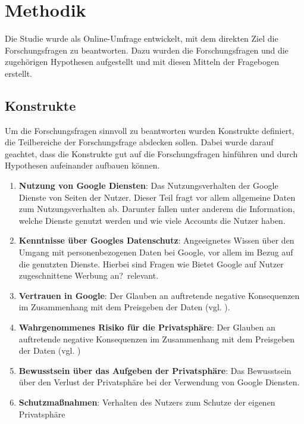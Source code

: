%
% 

\chapter{Methodik}

Die Studie wurde als Online-Umfrage entwickelt, mit dem direkten Ziel die Forschungsfragen zu beantworten. Dazu wurden die Forschungsfragen und die zugehörigen Hypothesen aufgestellt und mit diesen Mitteln der Fragebogen erstellt.


\section{Konstrukte}
\label{sec:categories}
Um die Forschungsfragen sinnvoll zu beantworten wurden Konstrukte definiert, die Teilbereiche der Forschungsfrage abdecken sollen. Dabei wurde darauf geachtet, dass die Konstrukte gut auf die Forschungsfragen hinführen und durch Hypothesen aufeinander aufbauen können.
\begin{enumerate}
\item \label{itm:Kat0}\textbf{Nutzung von Google Diensten}: Das Nutzungsverhalten der Google Dienste von Seiten der Nutzer. Dieser Teil fragt vor allem allgemeine Daten zum Nutzungsverhalten ab. Darunter fallen unter anderem die Information, welche Dienste genutzt werden und wie viele Accounts die Nutzer haben.
\item \label{itm:Kat1}\textbf{Kenntnisse über Googles Datenschutz}: Angeeignetes Wissen über den Umgang mit personenbezogenen Daten bei Google, vor allem im Bezug auf die genutzten Dienste. Hierbei sind Fragen wie \glqq Bietet Google auf Nutzer zugeschnittene Werbung an?\grqq\ relevant.
\item \label{itm:Kat2}\textbf{Vertrauen in Google}: Der Glauben an auftretende negative Konsequenzen im Zusammenhang mit dem Preisgeben der Daten (vgl. \citet{kim2008trust}).
\item \label{itm:Kat3}\textbf{Wahrgenommenes Risiko für die Privatsphäre}: Der Glauben an auftretende negative Konsequenzen im Zusammenhang mit dem Preisgeben der Daten (vgl. \citet{kim2008trust})
\item \label{itm:Kat4}\textbf{Bewusstsein über das Aufgeben der Privatsphäre}: Das Bewusstsein über den Verlust der Privatsphäre bei der Verwendung von Google Diensten.
\item \label{itm:Kat5}\textbf{Schutzmaßnahmen}: Verhalten des Nutzers zum Schutze der eigenen Privatsphäre
\end{enumerate}

